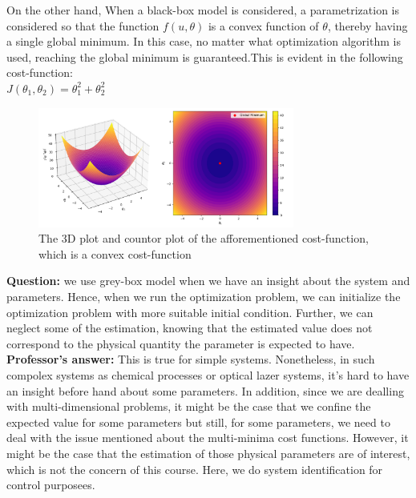 On the other hand, When a black-box model is considered, a parametrization is considered so that the function $f(u,\theta)$ is a convex function of $\theta$, thereby having a single global minimum. In this case, no matter what optimization algorithm is used, reaching the global minimum is guaranteed.This is evident in the following cost-function:\\

\(
J(\theta_1, \theta_2) = \theta_1^2 + \theta_2^2
\)
    
\begin{figure}[htbp]
    \centering
    \includegraphics[width=0.75\textwidth]{images/convex-cost-function.png}
    \caption{The 3D plot and countor plot of the afforementioned cost-function, which is a convex cost-function}
    \label{fig:multi-minima-cost-function}
\end{figure}


\begin{QandAbox}[Q and A]
    \textbf{Question:} we use grey-box model when we have an insight about the system and parameters. Hence, when we run the optimization problem, we can initialize the optimization problem with more suitable initial condition. Further, we can neglect some of the estimation, knowing that the estimated value does not correspond to the physical quantity the parameter is expected to have.\\
    
    \textbf{Professor's answer:} This is true for simple systems. Nonetheless, in such compolex systems as chemical processes or optical lazer systems, it's hard to have an insight before hand about some parameters. In addition, since we are dealling with multi-dimensional problems, it might be the case that we confine the expected value for some parameters but still, for some parameters, we need to deal with the issue mentioned about the multi-minima cost functions. However, it might be the case that the estimation of those physical parameters are of interest, which is not the concern of this course. Here, we do system identification for control purposees. \\
    
\end{QandAbox}

